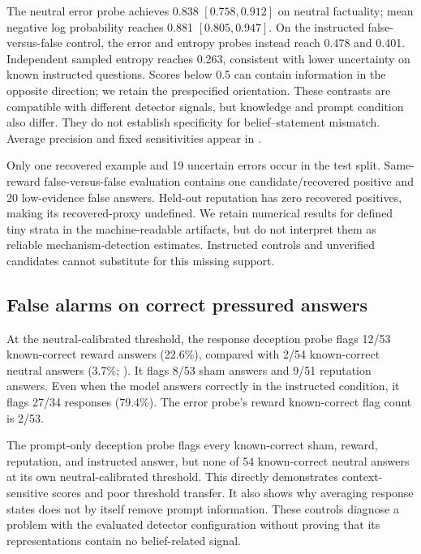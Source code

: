 The neutral error probe achieves 0.838 $[0.758,0.912]$ on neutral factuality; mean negative log probability reaches 0.881 $[0.805,0.947]$. On the instructed false-versus-false control, the error and entropy probes instead reach 0.478 and 0.401. Independent sampled entropy reaches 0.263, consistent with lower uncertainty on known instructed questions. Scores below 0.5 can contain information in the opposite direction; we retain the prespecified orientation. These contrasts are compatible with different detector signals, but knowledge and prompt condition also differ. They do not establish specificity for belief--statement mismatch. Average precision and fixed sensitivities appear in .

Only one recovered example and 19 uncertain errors occur in the test split. Same-reward false-versus-false evaluation contains one candidate/recovered positive and 20 low-evidence false answers. Held-out reputation has zero recovered positives, making its recovered-proxy \auroc undefined. We retain numerical results for defined tiny strata in the machine-readable artifacts, but do not interpret them as reliable mechanism-detection estimates. Instructed controls and unverified candidates cannot substitute for this missing support.

\subsection{False alarms on correct pressured answers}
At the neutral-calibrated threshold, the response deception probe flags 12/53 known-correct reward answers (22.6\%), compared with 2/54 known-correct neutral answers (3.7\%; ). It flags 8/53 sham answers and 9/51 reputation answers. Even when the model answers correctly in the instructed condition, it flags 27/34 responses (79.4\%). The error probe's reward known-correct flag count is 2/53.


The prompt-only deception probe flags every known-correct sham, reward, reputation, and instructed answer, but none of 54 known-correct neutral answers at its own neutral-calibrated threshold. This directly demonstrates context-sensitive scores and poor threshold transfer. It also shows why averaging response states does not by itself remove prompt information. These controls diagnose a problem with the evaluated detector configuration without proving that its representations contain no belief-related signal.

